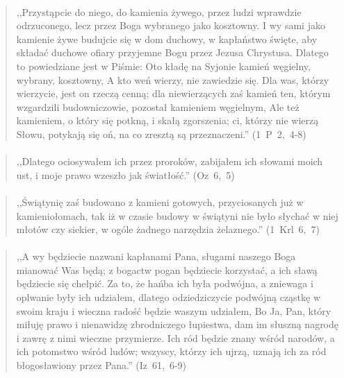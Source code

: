 \documentclass[10pt,a4paper,oneside]{article}
\begin{document}
\paragraph{}
\begin{quote}
,,Przystąpcie do niego, do kamienia żywego, przez ludzi wprawdzie odrzuconego, lecz przez Boga wybranego jako kosztowny. I wy sami jako kamienie żywe budujcie się w dom duchowy, w kapłaństwo święte, aby składać duchowe ofiary przyjemne Bogu przez Jezusa Chrystusa. Dlatego to powiedziane jest w Piśmie: Oto kładę na Syjonie kamień węgielny, wybrany, kosztowny, A kto weń wierzy, nie zawiedzie się. Dla was, którzy wierzycie, jest on rzeczą cenną; dla niewierzących zaś kamień ten, którym wzgardzili budowniczowie, pozostał kamieniem węgielnym, Ale też kamieniem, o który się potkną, i skałą zgorszenia; ci, którzy nie wierzą Słowu, potykają się oń, na co zresztą są przeznaczeni.'' \mbox{(1 P 2, 4-8)}
\end{quote}
\paragraph{}
\begin{quote}
,,Dlatego ociosywałem ich przez proroków, zabijałem ich słowami moich ust, i moje prawo wzeszło jak światłość.'' \mbox{(Oz 6, 5)}
\end{quote}
\paragraph{}
\begin{quote}
,,Świątynię zaś budowano z kamieni gotowych, przyciosanych już w kamieniołomach, tak iż w czasie budowy w świątyni nie było słychać w niej młotów czy siekier, w ogóle żadnego narzędzia żelaznego.'' \mbox{(1 Krl 6, 7)}
\end{quote}
\paragraph{}
\begin{quote}
,,A wy będziecie nazwani kapłanami Pana, sługami naszego Boga mianować Was będą; z bogactw pogan będziecie korzystać, a ich sławą będziecie się chełpić. Za to, że hańba ich była podwójna, a zniewaga i oplwanie były ich udziałem, dlatego odziedziczycie podwójną cząstkę w swoim kraju i wieczna radość będzie waszym udziałem, Bo Ja, Pan, który miłuję prawo i nienawidzę zbrodniczego łupiestwa, dam im słuszną nagrodę i zawrę z nimi wieczne przymierze. Ich ród będzie znany wśród narodów, a ich potomstwo wśród ludów; wszyscy, którzy ich ujrzą, uznają ich za ród błogosławiony przez Pana.'' \mbox{(Iz 61, 6-9)}
\end{quote}
\end{document}
